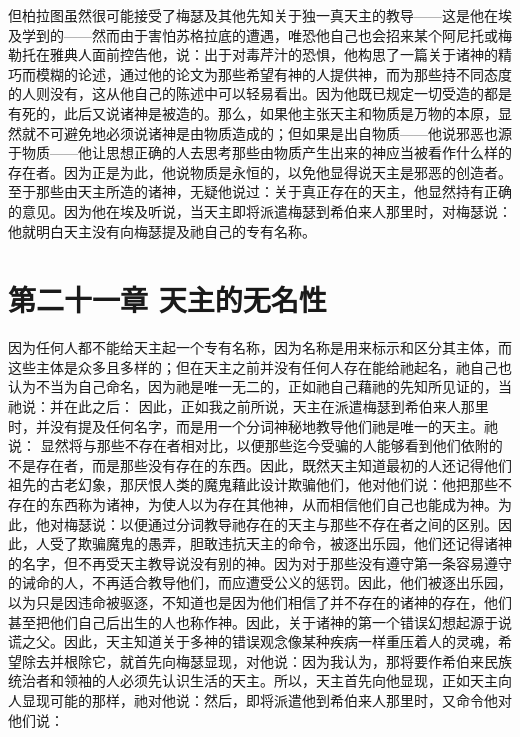 但柏拉图虽然很可能接受了梅瑟及其他先知关于独一真天主的教导——这是他在埃及学到的——然而由于害怕苏格拉底的遭遇，唯恐他自己也会招来某个阿尼托或梅勒托在雅典人面前控告他，说：出于对毒芹汁的恐惧，他构思了一篇关于诸神的精巧而模糊的论述，通过他的论文为那些希望有神的人提供神，而为那些持不同态度的人则没有，这从他自己的陈述中可以轻易看出。因为他既已规定一切受造的都是有死的，此后又说诸神是被造的。那么，如果他主张天主和物质是万物的本原，显然就不可避免地必须说诸神是由物质造成的；但如果是出自物质——他说邪恶也源于物质——他让思想正确的人去思考那些由物质产生出来的神应当被看作什么样的存在者。因为正是为此，他说物质是永恒的，以免他显得说天主是邪恶的创造者。至于那些由天主所造的诸神，无疑他说过：关于真正存在的天主，他显然持有正确的意见。因为他在埃及听说，当天主即将派遣梅瑟到希伯来人那里时，对梅瑟说：他就明白天主没有向梅瑟提及祂自己的专有名称。\par


\section{第二十一章 天主的无名性}

因为任何人都不能给天主起一个专有名称，因为名称是用来标示和区分其主体，而这些主体是众多且多样的；但在天主之前并没有任何人存在能给祂起名，祂自己也认为不当为自己命名，因为祂是唯一无二的，正如祂自己藉祂的先知所见证的，当祂说：并在此之后：  因此，正如我之前所说，天主在派遣梅瑟到希伯来人那里时，并没有提及任何名字，而是用一个分词神秘地教导他们祂是唯一的天主。祂说： 显然将与那些不存在者相对比，以便那些迄今受骗的人能够看到他们依附的不是存在者，而是那些没有存在的东西。因此，既然天主知道最初的人还记得他们祖先的古老幻象，那厌恨人类的魔鬼藉此设计欺骗他们，他对他们说：他把那些不存在的东西称为诸神，为使人以为存在其他神，从而相信他们自己也能成为神。为此，他对梅瑟说：以便通过分词教导祂存在的天主与那些不存在者之间的区别。因此，人受了欺骗魔鬼的愚弄，胆敢违抗天主的命令，被逐出乐园，他们还记得诸神的名字，但不再受天主教导说没有别的神。因为对于那些没有遵守第一条容易遵守的诫命的人，不再适合教导他们，而应遭受公义的惩罚。因此，他们被逐出乐园，以为只是因违命被驱逐，不知道也是因为他们相信了并不存在的诸神的存在，他们甚至把他们自己后出生的人也称作神。因此，关于诸神的第一个错误幻想起源于说谎之父。因此，天主知道关于多神的错误观念像某种疾病一样重压着人的灵魂，希望除去并根除它，就首先向梅瑟显现，对他说：因为我认为，那将要作希伯来民族统治者和领袖的人必须先认识生活的天主。所以，天主首先向他显现，正如天主向人显现可能的那样，祂对他说：然后，即将派遣他到希伯来人那里时，又命令他对他们说：\par

